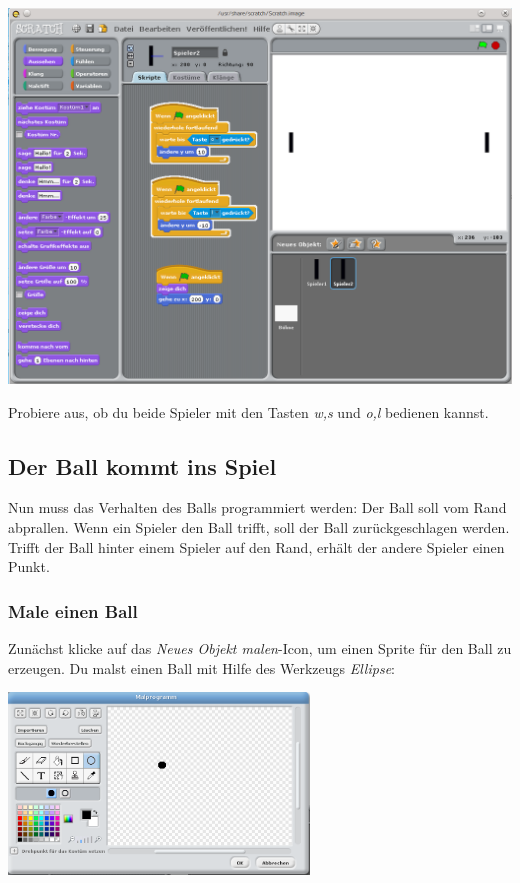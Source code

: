 \includegraphics[width=1\textwidth]{images/aufgabe5_pong_sprite_spieler2.png}

Probiere aus, ob du beide Spieler mit den Tasten \emph{w,s} und \emph{o,l} bedienen kannst.

\subsection{Der Ball kommt ins Spiel}
Nun muss das Verhalten des Balls programmiert werden: Der Ball soll vom Rand abprallen. Wenn ein Spieler den Ball trifft, soll der Ball zurückgeschlagen werden. Trifft der Ball hinter einem Spieler auf den Rand, erhält der andere Spieler einen Punkt.

\subsubsection{Male einen Ball}
Zunächst klicke auf das \textit{Neues Objekt malen}-Icon, um einen Sprite für den Ball zu erzeugen. 
Du malst einen Ball mit Hilfe des Werkzeugs \emph{Ellipse}:

\includegraphics[width=0.6\textwidth]{images/aufgabe5_pong_sprite_ball_malen.png}


